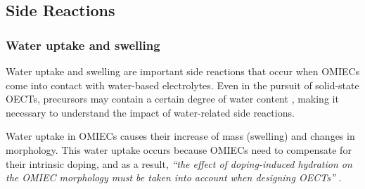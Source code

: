 \subsection{Side Reactions} \label{subsec:sidereac}



\subsubsection{Water uptake and swelling}

Water uptake and swelling are important side reactions that occur when OMIECs come into contact with water-based electrolytes. Even in the pursuit of solid-state OECTs, precursors may contain a certain degree of water content  \cite{weissbachPhotopatternableSolidElectrolyte2022}\cite{nguyen-dangBiomaterialBasedSolidElectrolyteOrganic2021}, making it necessary to understand the impact of water-related side reactions. %

Water uptake in OMIECs causes their increase of mass (swelling) and changes in morphology. This water uptake occurs because OMIECs need to compensate for their intrinsic doping, and as a result, \textit{``the effect of doping-induced hydration on the OMIEC morphology must be taken into account when designing OECTs''} \cite{savvaBalancingIonicElectronic2020}.


